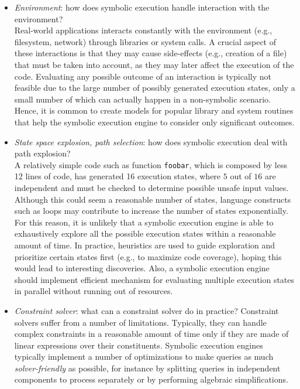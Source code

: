 \begin{itemize}
  \item {\em Environment}: how does symbolic execution handle interaction with the environment? \\
  Real-world applications interacts constantly with the environment (e.g., filesystem, network) through libraries or system calls. A crucial aspect of these interactions is that they may cause side-effects
(e.g., creation of a file)
that must be taken into account, as they may later affect the 
execution of the code. Evaluating any possible outcome of an interaction is typically not feasible due to the large number of possibly generated execution states, only a small number of which can actually happen in a non-symbolic scenario. Hence, it is common to create models for popular library and system routines that help the symbolic execution engine to consider only significant outcomes.
\vspace{1mm}

  \item {\em State space explosion, path selection}: how does symbolic execution deal with path explosion? \\
  A relatively simple code such as function {\tt foobar}, which is composed by less 12 lines of code, has generated 16 execution states, where $5$ out of $16$ are independent and must be checked to determine possible unsafe input values. Although this could seem a reasonable number of states, language constructs such as loops may contribute to increase the number of states exponentially. For this reason, it is unlikely that a symbolic execution engine is able to exhaustively explore all the possible execution states within a reasonable amount of time. In practice, heuristics are used to guide exploration and prioritize certain states first (e.g., to maximize code coverage), hoping this would lead to interesting discoveries. Also, a symbolic execution engine should implement efficient mechanism for evaluating multiple execution states in parallel without running out of resources.
\vspace{1mm}

  \item {\em Constraint solver}: what can a constraint solver do in practice?
 Constraint solvers suffer from a number of limitations. Typically, they can handle complex constraints in a reasonable amount of time only if they are made of linear expressions over their constituents. Symbolic execution engines typically implement a number of optimizations to make queries as much {\em solver-friendly} as possible, for instance by splitting queries in independent components to process separately or by performing algebraic simplifications.
\vspace{1mm}


\end{itemize}
